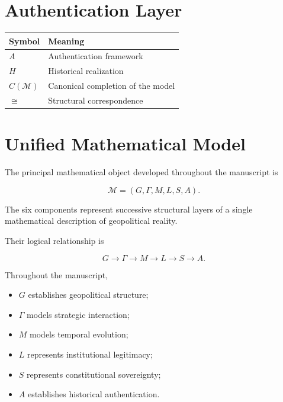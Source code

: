 \documentclass[11pt,openany]{book}
\theoremstyle{plain}
\theoremstyle{definition}
\begin{document}
\section*{Authentication Layer}

\begin{center}
\begin{tabular}{ll}
\toprule
\textbf{Symbol} & \textbf{Meaning} \\
\midrule
\(A\) & Authentication framework \\
\(H\) & Historical realization \\
\(C(\mathcal{M})\) & Canonical completion of the model \\
\(\cong\) & Structural correspondence \\
\bottomrule
\end{tabular}
\end{center}

\section*{Unified Mathematical Model}

The principal mathematical object developed throughout the manuscript is

\[
\boxed{
\mathcal{M}
=
(G,\Gamma,M,L,S,A).
}
\]

The six components represent successive structural layers of a single mathematical description of geopolitical reality.

Their logical relationship is

\[
\boxed{
G
\longrightarrow
\Gamma
\longrightarrow
M
\longrightarrow
L
\longrightarrow
S
\longrightarrow
A.
}
\]

Throughout the manuscript,

\begin{itemize}
\item \(G\) establishes geopolitical structure;
\item \(\Gamma\) models strategic interaction;
\item \(M\) models temporal evolution;
\item \(L\) represents institutional legitimacy;
\item \(S\) represents constitutional sovereignty;
\item \(A\) establishes historical authentication.
\end{itemize}
\end{document}
